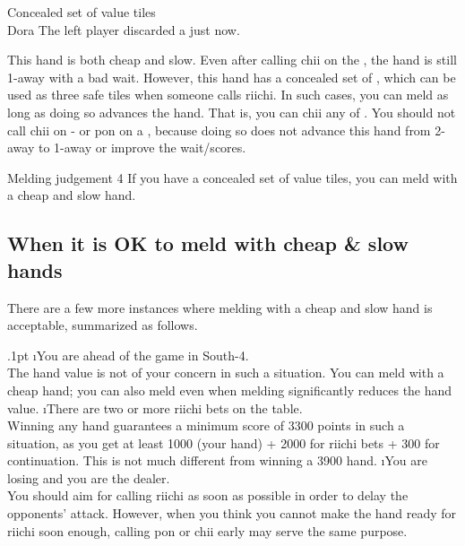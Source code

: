\begin{itembox}[r]{Concealed set of value tiles}
\bp
{}\zhong\zhong\zhong~~\xi\\
\hspace{295pt}\footnotesize{\jap Dora}
\ep
\vspace{-20pt}The left player discarded a {\large{}} just now.
\end{itembox}

\noindent
This hand is both cheap and slow. Even after calling {\jap chii} on the {\large{}}, the hand is still 1-away with a bad wait. However, this hand has a concealed set of {\large\zhong}, which can be used as three safe tiles when someone calls {\jap riichi}. In such cases, you can meld as long as doing so advances the hand. That is, you can {\jap chii} any of {\large{}}. You should not call {\jap chii} on {\large{}-} or {\jap pon} on a , because doing so does not advance this hand from 2-away to 1-away or improve the wait/scores. 

\bigskip
\begin{itembox}[c]{Melding judgement 4}
If you have a concealed set of value tiles, you can meld with a cheap and slow hand.
\end{itembox}

\subsection{When it is OK to meld with cheap \& slow hands}
There are a few more instances where melding with a cheap and slow hand is acceptable, summarized as follows. 

\be\itemsep.1pt
\i You are ahead of the game in South-4.\\
The hand value is not of your concern in such a situation. You can meld with a cheap hand; you can also meld even when melding significantly reduces the hand value.
\i There are two or more {\jap riichi} bets on the table.\\
Winning any hand guarantees a minimum score of 3300 points in such a situation, as you get at least 1000 (your hand) + 2000 for {\jap riichi} bets + 300 for continuation. This is not much different from winning a 3900 hand.
\i You are losing and you are the dealer.\\
You should aim for calling {\jap riichi} as soon as possible in order to delay the opponents' attack. However, when you think you cannot make the hand ready for {\jap riichi} soon enough, calling {\jap pon} or {\jap chii} early may serve the same purpose. 
\ee

